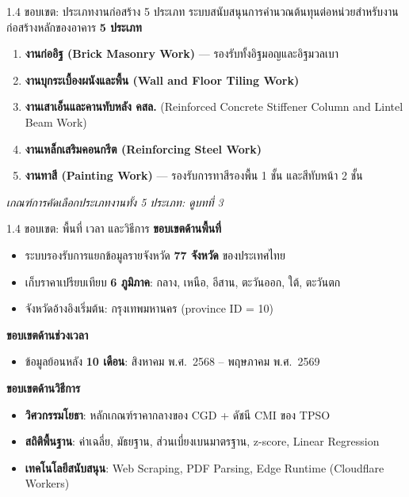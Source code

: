 \documentclass[aspectratio=169,11pt]{beamer}
\begin{document}
\begin{frame}{1.4 ขอบเขต: ประเภทงานก่อสร้าง 5 ประเภท}
  ระบบสนับสนุนการคำนวณต้นทุนต่อหน่วยสำหรับงานก่อสร้างหลักของอาคาร
  \textbf{5 ประเภท}
  \begin{enumerate}
    \item \textbf{งานก่ออิฐ (Brick Masonry Work)} --- รองรับทั้งอิฐมอญและอิฐมวลเบา
    \item \textbf{งานบุกระเบื้องผนังและพื้น (Wall and Floor Tiling Work)}
    \item \textbf{งานเสาเอ็นและคานทับหลัง คสล.} (Reinforced Concrete Stiffener
          Column and Lintel Beam Work)
    \item \textbf{งานเหล็กเสริมคอนกรีต (Reinforcing Steel Work)}
    \item \textbf{งานทาสี (Painting Work)} --- รองรับการทาสีรองพื้น 1 ชั้น
          และสีทับหน้า 2 ชั้น
  \end{enumerate}
  \vspace{0.5em}
  \footnotesize\emph{เกณฑ์การคัดเลือกประเภทงานทั้ง 5 ประเภท: ดูบทที่ 3}
\end{frame}

\begin{frame}{1.4 ขอบเขต: พื้นที่ เวลา และวิธีการ}
  \textbf{ขอบเขตด้านพื้นที่}
  \begin{itemize}
    \item ระบบรองรับการแยกข้อมูลรายจังหวัด \textbf{77 จังหวัด} ของประเทศไทย
    \item เก็บราคาเปรียบเทียบ \textbf{6 ภูมิภาค}: กลาง, เหนือ, อีสาน, ตะวันออก, ใต้,
          ตะวันตก
    \item จังหวัดอ้างอิงเริ่มต้น: กรุงเทพมหานคร (province ID = 10)
  \end{itemize}
  \vspace{0.3em}
  \textbf{ขอบเขตด้านช่วงเวลา}
  \begin{itemize}
    \item ข้อมูลย้อนหลัง \textbf{10 เดือน}: สิงหาคม พ.ศ.~2568 -- พฤษภาคม พ.ศ.~2569
  \end{itemize}
  \vspace{0.3em}
  \textbf{ขอบเขตด้านวิธีการ}
  \begin{itemize}
    \item \textbf{วิศวกรรมโยธา}: หลักเกณฑ์ราคากลางของ CGD + ดัชนี CMI ของ TPSO
    \item \textbf{สถิติพื้นฐาน}: ค่าเฉลี่ย, มัธยฐาน, ส่วนเบี่ยงเบนมาตรฐาน, z-score,
          Linear Regression
    \item \textbf{เทคโนโลยีสนับสนุน}: Web Scraping, PDF Parsing, Edge Runtime
          (Cloudflare Workers)
  \end{itemize}
\end{frame}
\end{document}
